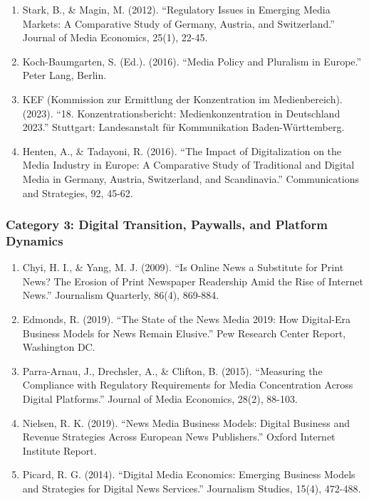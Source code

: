 {\begin{enumerate}
\item Stark, B., \& Magin, M. (2012). ``Regulatory Issues in Emerging Media Markets: A Comparative
  Study of Germany, Austria, and Switzerland.'' Journal of Media Economics, 25(1), 22-45.

\item Koch-Baumgarten, S. (Ed.). (2016). ``Media Policy and Pluralism in Europe.'' Peter Lang, Berlin.

\item KEF (Kommission zur Ermittlung der Konzentration im Medienbereich). (2023). ``18. Konzentrationsbericht:
  Medienkonzentration in Deutschland 2023.'' Stuttgart: Landesanstalt für Kommunikation Baden-Württemberg.

\item Henten, A., \& Tadayoni, R. (2016). ``The Impact of Digitalization on the Media Industry in Europe:
  A Comparative Study of Traditional and Digital Media in Germany, Austria, Switzerland, and Scandinavia.''
  Communications and Strategies, 92, 45-62.
\end{enumerate}

\subsubsection*{Category 3: Digital Transition, Paywalls, and Platform Dynamics}

\begin{enumerate}
\item Chyi, H. I., \& Yang, M. J. (2009). ``Is Online News a Substitute for Print News? The Erosion of
  Print Newspaper Readership Amid the Rise of Internet News.'' Journalism Quarterly, 86(4), 869-884.

\item Edmonds, R. (2019). ``The State of the News Media 2019: How Digital-Era Business Models for News
  Remain Elusive.'' Pew Research Center Report, Washington DC.

\item Parra-Arnau, J., Drechsler, A., \& Clifton, B. (2015). ``Measuring the Compliance with Regulatory
  Requirements for Media Concentration Across Digital Platforms.'' Journal of Media Economics, 28(2), 88-103.

\item Nielsen, R. K. (2019). ``News Media Business Models: Digital Business and Revenue Strategies
  Across European News Publishers.'' Oxford Internet Institute Report.

\item Picard, R. G. (2014). ``Digital Media Economics: Emerging Business Models and Strategies for
  Digital News Services.'' Journalism Studies, 15(4), 472-488.
\end{enumerate}

}
